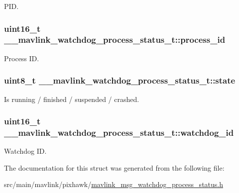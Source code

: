 P\+I\+D. 

\hypertarget{struct____mavlink__watchdog__process__status__t_a9015409cbff8b99580ec431b5d42b921}{
\subsubsection[{process\+\_\+id}]{\setlength{\rightskip}{0pt plus 5cm}uint16\+\_\+t \+\_\+\+\_\+mavlink\+\_\+watchdog\+\_\+process\+\_\+status\+\_\+t\+::process\+\_\+id}}\label{struct____mavlink__watchdog__process__status__t_a9015409cbff8b99580ec431b5d42b921}


Process I\+D. 

\hypertarget{struct____mavlink__watchdog__process__status__t_a5a11ccdd872a2e0d8c584af11247fe75}{
\subsubsection[{state}]{\setlength{\rightskip}{0pt plus 5cm}uint8\+\_\+t \+\_\+\+\_\+mavlink\+\_\+watchdog\+\_\+process\+\_\+status\+\_\+t\+::state}}\label{struct____mavlink__watchdog__process__status__t_a5a11ccdd872a2e0d8c584af11247fe75}


Is running / finished / suspended / crashed. 

\hypertarget{struct____mavlink__watchdog__process__status__t_a16977325eb65377b7a6a980aebc0738a}{
\subsubsection[{watchdog\+\_\+id}]{\setlength{\rightskip}{0pt plus 5cm}uint16\+\_\+t \+\_\+\+\_\+mavlink\+\_\+watchdog\+\_\+process\+\_\+status\+\_\+t\+::watchdog\+\_\+id}}\label{struct____mavlink__watchdog__process__status__t_a16977325eb65377b7a6a980aebc0738a}


Watchdog I\+D. 



The documentation for this struct was generated from the following file\+:\begin{DoxyCompactItemize}
\item 
src/main/mavlink/pixhawk/\hyperlink{mavlink__msg__watchdog__process__status_8h}{mavlink\+\_\+msg\+\_\+watchdog\+\_\+process\+\_\+status.\+h}\end{DoxyCompactItemize}
